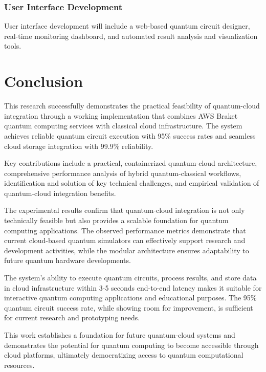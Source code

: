 \documentclass[onecolumn]{IEEEtran}
\begin{document}
\subsubsection{User Interface Development}
User interface development will include a web-based quantum circuit designer, real-time monitoring dashboard, and automated result analysis and visualization tools.

\section{Conclusion}

This research successfully demonstrates the practical feasibility of quantum-cloud integration through a working implementation that combines AWS Braket quantum computing services with classical cloud infrastructure. The system achieves reliable quantum circuit execution with 95\% success rates and seamless cloud storage integration with 99.9\% reliability.

Key contributions include a practical, containerized quantum-cloud architecture, comprehensive performance analysis of hybrid quantum-classical workflows, identification and solution of key technical challenges, and empirical validation of quantum-cloud integration benefits.

The experimental results confirm that quantum-cloud integration is not only technically feasible but also provides a scalable foundation for quantum computing applications. The observed performance metrics demonstrate that current cloud-based quantum simulators can effectively support research and development activities, while the modular architecture ensures adaptability to future quantum hardware developments.

The system's ability to execute quantum circuits, process results, and store data in cloud infrastructure within 3-5 seconds end-to-end latency makes it suitable for interactive quantum computing applications and educational purposes. The 95\% quantum circuit success rate, while showing room for improvement, is sufficient for current research and prototyping needs.

This work establishes a foundation for future quantum-cloud systems and demonstrates the potential for quantum computing to become accessible through cloud platforms, ultimately democratizing access to quantum computational resources.


\end{document}
